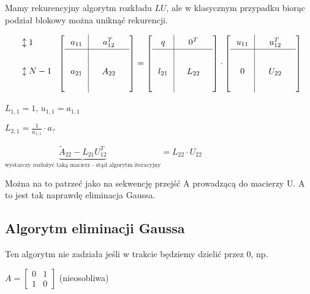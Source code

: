 \documentclass[hidelinks,a4paper]{article}
\begin{document}
Mamy rekurencyjny algorytm rozkładu $LU$, ale w klasycznym przypadku biorąc podział blokowy można uniknąć rekurencji.

\[\arraycolsep=0.7em\def\arraystretch{1.4}
	\begin{array}{l}
		\updownarrow 1   \\ \\
		\updownarrow N-1 \\ \ 
	\end{array}
	\left[
		\begin{array}{c|c}
			a_{11} & \quad a_{12}^T \quad \\ \hline & \\
			a_{21} & A_{22}               \\ &
		\end{array}
	\right] =
	\left[
		\begin{array}{c|c}
			q      & \quad 0^T \quad \\ \hline & \\
			l_{21} & L_{22}          \\ &
		\end{array}
	\right]
	\cdot 
	\left[
		\begin{array}{c|c}
			u_{11} & \quad u_{12}^T \quad \\ \hline & \\
			0      & U_{22}               \\ &
		\end{array}
	\right]
\]

$L_{1,1} = 1$, $u_{1,1} = a_{1,1}$

$L_{2,1} = \frac{1}{a_{1,1}} \cdot a_{?}$

$\underbrace{\tilde{A}_{22} - L_{21}U_{12}^T}_{\textrm{wystarczy rozłożyć taką macierz - stąd algorytm iteracyjny}} = L_{22} \cdot U_{22}$


Można na to patrzeć jako na sekwencję przejść A prowadzącą do macierzy U. A to jest tak naprawdę eliminacja Gaussa.

\subsection{Algorytm eliminacji Gaussa}

Ten algorytm nie zadziała jeśli w trakcie będziemy dzielić przez 0, np.

$A = \left[
	\begin{array}{cc}
		0 & 1 \\
		1 & 0 
\end{array}\right]$ (nieosobliwa)
    
\end{document}
